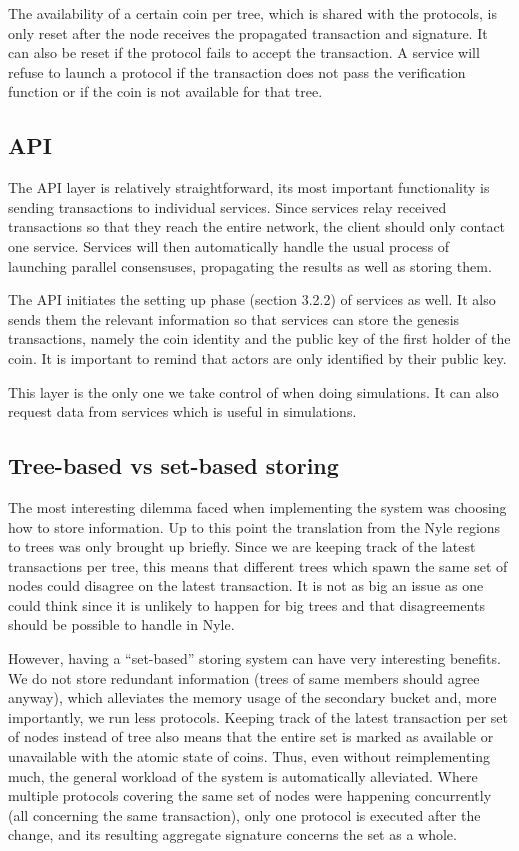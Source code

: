 \documentclass[11pt, a4paper, twoside, openright]{article}
\begin{document}
The availability of a certain coin per tree, which is shared with the protocols, is only reset after the node receives the propagated transaction and signature. It can also be reset if the protocol fails to accept the transaction. A service will refuse to launch a protocol if the transaction does not pass the verification function or if the coin is not available for that tree.


\subsection{API}
The API layer is relatively straightforward, its most important functionality is sending transactions to individual services. Since services relay received transactions so that they reach the entire network, the client should only contact one service. Services will then automatically handle the usual process of launching parallel consensuses, propagating the results as well as storing them.

The API initiates the setting up phase (section 3.2.2) of services as well. It also sends them the relevant information so that services can store the genesis transactions, namely the coin identity and the public key of the first holder of the coin. It is important to remind that actors are only identified by their public key.

This layer is the only one we take control of when doing simulations. It can also request data from services which is useful in simulations.

\subsection{Tree-based vs set-based storing}

The most interesting dilemma faced when implementing the system was choosing how to store information. Up to this point the translation from the Nyle regions to trees was only brought up briefly. Since we are keeping track of the latest transactions per tree, this means that different trees which spawn the same set of nodes could disagree on the latest transaction. It is not as big an issue as one could think since it is unlikely to happen for big trees and that disagreements should be possible to handle in Nyle. 

However, having a ``set-based'' storing system can have very interesting benefits. We do not store redundant information (trees of same members should agree anyway), which alleviates the memory usage of the secondary bucket and, more importantly, we run less protocols. Keeping track of the latest transaction per set of nodes instead of tree also means that the entire set is marked as available or unavailable with the atomic state of coins. Thus, even without reimplementing much, the general workload of the system is automatically alleviated. Where multiple protocols covering the same set of nodes were happening concurrently (all concerning the same transaction), only one protocol is executed after the change, and its resulting aggregate signature concerns the set as a whole.
\end{document}
